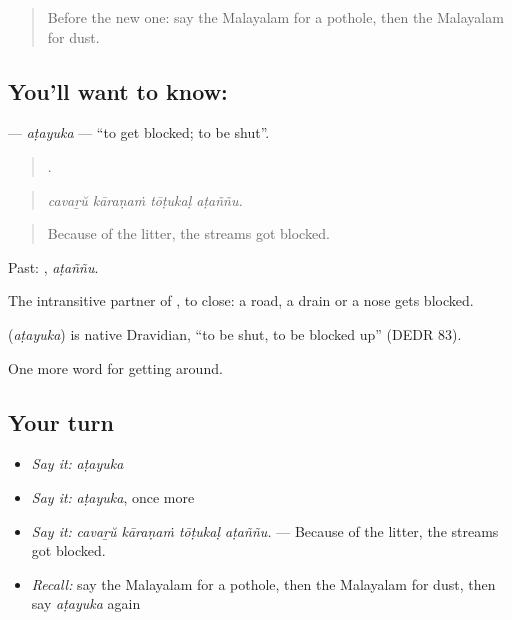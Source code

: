 \begin{quote}
Before the new one: say the Malayalam for a pothole, then the Malayalam for dust.
\end{quote}

\subsection*{You'll want to know: }
\textbf{} — \emph{aṭayuka} — \textquotedblleft{}to get blocked; to be shut\textquotedblright{}.

\begin{quote}
   .
\end{quote}

\begin{quote}
\emph{cavaṟŭ kāraṇaṁ tōṭukaḷ aṭaññu.}
\end{quote}

\begin{quote}
Because of the litter, the streams got blocked.
\end{quote}

Past: , \emph{aṭaññu}.

The intransitive partner of , to close: a road, a drain or a nose gets blocked.

\begin{cousinweb}
\textbf{} (\emph{aṭayuka}) is native Dravidian, \textquotedblleft{}to be shut, to be blocked up\textquotedblright{} (DEDR 83).
\end{cousinweb}

\begin{grammarlens}[title={What you've built}]
One more word for getting around.
\end{grammarlens}

\subsection*{Your turn}
\begin{itemize}
\raggedright
  \item \emph{Say it:} \emph{aṭayuka}
  \item \emph{Say it:} \emph{aṭayuka}, once more
  \item \emph{Say it:} \emph{cavaṟŭ kāraṇaṁ tōṭukaḷ aṭaññu.} — Because of the litter, the streams got blocked.
  \item \emph{Recall:} say the Malayalam for a pothole, then the Malayalam for dust, then say \emph{aṭayuka} again
\end{itemize}

